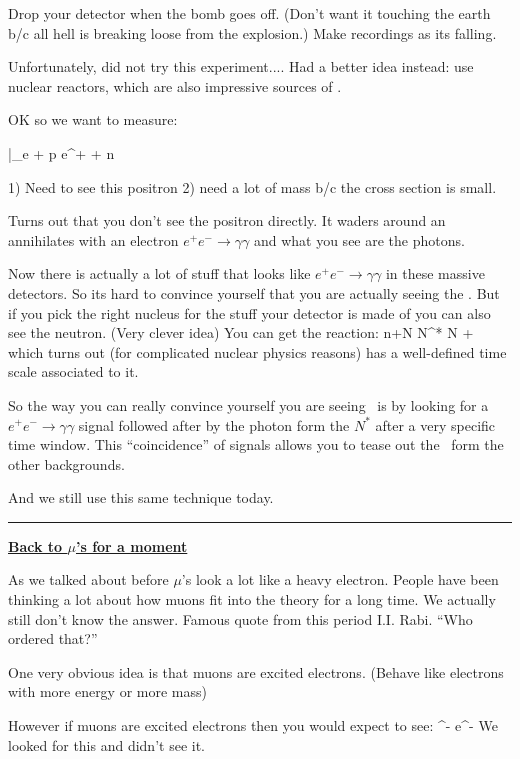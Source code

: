 {Drop your detector when the bomb goes off. 
(Don't want it touching the earth b/c all hell is breaking loose from the explosion.)
Make recordings as its falling. 

Unfortunately, did not try this experiment....
Had a better idea instead: use nuclear reactors, which are also impressive sources of \nus.


OK so we want to measure:

\be
\bar{\nu}_e + p \rightarrow e^+ + n
\ee

1) Need to see this positron 2) need a lot of mass b/c the cross section is small. 

Turns out that you don't see the positron directly. 
It waders around an annihilates with an electron $e^+e^-\rightarrow \gamma\gamma$ and what you see are the photons. 

Now there is actually a lot of stuff that looks like $e^+e^-\rightarrow \gamma\gamma$ in these massive detectors.
So its hard to convince yourself that you are actually seeing the \nus.
But if you pick the right nucleus for the stuff your detector is made of you can also see the neutron. 
(Very clever idea) You can get the reaction:
\be
n+N \rightarrow N^* \rightarrow N + \gamma
\ee
which turns out (for complicated nuclear physics reasons) has a well-defined time scale associated to it. 

So the way you can really convince yourself you are seeing \nus\ is by looking for a $e^+e^-\rightarrow \gamma\gamma$ signal followed after by the photon form the $N^*$ after a very specific time window. 
This ``coincidence'' of signals allows you to tease out the \nus\ form the other backgrounds.

And we still use this same technique today.

\noindent\rule{\textwidth}{1pt}

\textbf{\underline{Back to $\mu$'s for a moment}}

As we talked about before $\mu$'s look a lot like a heavy electron. 
People have been thinking a lot about how muons fit into the theory for a long time. 
We actually still don't know the answer.  
Famous quote from this period I.I. Rabi. ``Who ordered that?''

One very obvious idea is that muons are excited electrons. (Behave like electrons with more energy or more mass) 

However if muons are excited electrons then you would expect to see:
\be
\mu^- \rightarrow e^- \gamma
\ee
We looked for this and didn't see it. 

}
